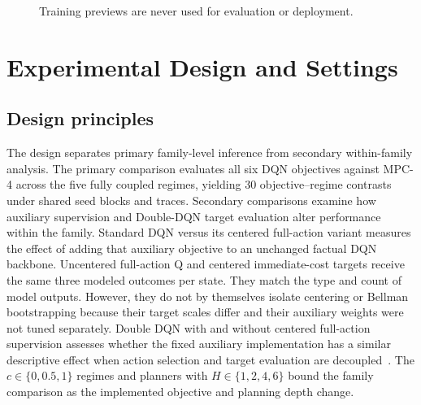 \documentclass[11pt]{article}
\begin{document}
\begin{figure}[H]
\centering
{}
\par\smallskip
\caption*{Training previews are never used for evaluation or deployment.}
\label{alg:cbad}
\end{figure}

\section{Experimental Design and Settings}
\label{sec:experiments}

\subsection{Design principles}

The design separates primary family-level inference from secondary within-family analysis. The primary comparison evaluates all six DQN objectives against MPC-4 across the five fully coupled regimes, yielding 30 objective--regime contrasts under shared seed blocks and traces. Secondary comparisons examine how auxiliary supervision and Double-DQN target evaluation alter performance within the family. Standard DQN versus its centered full-action variant measures the effect of adding that auxiliary objective to an unchanged factual DQN backbone. Uncentered full-action Q and centered immediate-cost targets receive the same three modeled outcomes per state. They match the type and count of model outputs. However, they do not by themselves isolate centering or Bellman bootstrapping because their target scales differ and their auxiliary weights were not tuned separately. Double DQN with and without centered full-action supervision assesses whether the fixed auxiliary implementation has a similar descriptive effect when action selection and target evaluation are decoupled~\cite{vanhasselt2016double}. The $c\in\{0,0.5,1\}$ regimes and planners with $H\in\{1,2,4,6\}$ bound the family comparison as the implemented objective and planning depth change.
\end{document}
